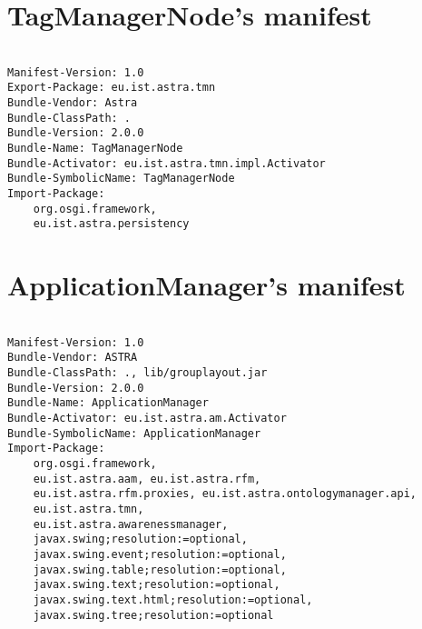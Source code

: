 \section{TagManagerNode's manifest}

\begin{verbatim}

Manifest-Version: 1.0
Export-Package: eu.ist.astra.tmn
Bundle-Vendor: Astra
Bundle-ClassPath: .
Bundle-Version: 2.0.0
Bundle-Name: TagManagerNode
Bundle-Activator: eu.ist.astra.tmn.impl.Activator
Bundle-SymbolicName: TagManagerNode
Import-Package: 
	org.osgi.framework, 
	eu.ist.astra.persistency

\end{verbatim}

\section{ApplicationManager's manifest}

\begin{verbatim}

Manifest-Version: 1.0
Bundle-Vendor: ASTRA
Bundle-ClassPath: ., lib/grouplayout.jar
Bundle-Version: 2.0.0
Bundle-Name: ApplicationManager
Bundle-Activator: eu.ist.astra.am.Activator
Bundle-SymbolicName: ApplicationManager
Import-Package: 
	org.osgi.framework, 
	eu.ist.astra.aam, eu.ist.astra.rfm,
	eu.ist.astra.rfm.proxies, eu.ist.astra.ontologymanager.api, 
	eu.ist.astra.tmn,
	eu.ist.astra.awarenessmanager, 
	javax.swing;resolution:=optional,
	javax.swing.event;resolution:=optional, 
	javax.swing.table;resolution:=optional,
	javax.swing.text;resolution:=optional, 
	javax.swing.text.html;resolution:=optional, 
	javax.swing.tree;resolution:=optional

\end{verbatim}
